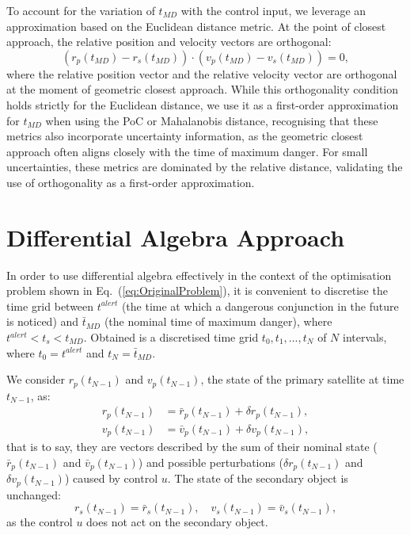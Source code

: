 \documentclass[letterpaper, preprint, paper,11pt]{AAS}	%
\renewcommand{\eqref}[1]{Eq.~(\ref{#1})}
\begin{document}
To account for the variation of $t_{MD}$ with the control input, we leverage an approximation based on the Euclidean distance metric. At the point of closest approach, the relative position and velocity vectors are orthogonal:
\begin{equation}\label{eq:TrackTCA}
	(r_p(t_{MD}) - r_s(t_{MD})) \cdot (v_p(t_{MD}) - v_s(t_{MD})) = 0,
\end{equation}
where the relative position vector and the relative velocity vector are orthogonal at the moment of geometric closest approach. While this orthogonality condition holds strictly for the Euclidean distance, we use it as a first-order approximation for $t_{MD}$ when using the PoC or Mahalanobis distance, recognising that these metrics also incorporate uncertainty information, as the geometric closest approach often aligns closely with the time of maximum danger. For small uncertainties, these metrics are dominated by the relative distance, validating the use of orthogonality as a first-order approximation.

\section{Differential Algebra Approach}

In order to use differential algebra effectively in the context of the optimisation problem shown in \eqref{eq:OriginalProblem}, it is convenient to discretise the time grid between $t^{alert}$ (the time at which a dangerous conjunction in the future is noticed) and $\bar{t}_{MD}$ (the nominal time of maximum danger), where $t^{alert} < t_s < t_{MD}$. Obtained is a discretised time grid $t_0, t_1, ..., t_N$ of $N$ intervals, where $t_0 = t^{alert}$ and $t_N = \bar{t}_{MD}$.  

We consider \( r_p(t_{N-1}) \) and \( v_p(t_{N-1}) \), the state of the primary satellite at time \( t_{N-1} \), as:
\begin{align}
	r_p(t_{N-1}) &= \bar{r}_p(t_{N-1}) + \delta r_p(t_{N-1}), \\
	v_p(t_{N-1}) &= \bar{v}_p(t_{N-1}) + \delta v_p(t_{N-1}),
\end{align}
that is to say, they are vectors described by the sum of their nominal state (\( \bar{r}_p(t_{N-1}) \) and \( \bar{v}_p(t_{N-1}) \)) and possible perturbations (\( \delta r_p(t_{N-1}) \) and \( \delta v_p(t_{N-1}) \)) caused by control \( u \). The state of the secondary object is unchanged: 
\[
r_s(t_{N-1}) = \bar{r}_s(t_{N-1}), \quad 
v_s(t_{N-1}) = \bar{v}_s(t_{N-1}),
\]
as the control \( u \) does not act on the secondary object.
\end{document}
